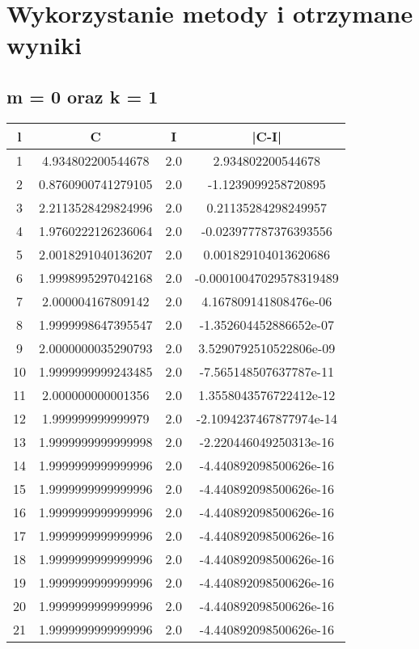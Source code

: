 \documentclass{article}
\begin{document}
\newpage
\section{Wykorzystanie metody i otrzymane wyniki} 
\subsection{m = 0 oraz k = 1}

\begin{table}[h!]
\centering
\begin{tabular}{cccc}
\toprule
l & C & I & |C-I| \\
\midrule
1 & 4.934802200544678 & 2.0 & 2.934802200544678 \\
2 & 0.8760900741279105 & 2.0 & -1.1239099258720895 \\
3 & 2.2113528429824996 & 2.0 & 0.21135284298249957 \\
4 & 1.9760222126236064 & 2.0 & -0.023977787376393556 \\
5 & 2.0018291040136207 & 2.0 & 0.001829104013620686 \\
6 & 1.9998995297042168 & 2.0 & -0.00010047029578319489 \\
7 & 2.000004167809142 & 2.0 & 4.167809141808476e-06 \\
8 & 1.9999998647395547 & 2.0 & -1.352604452886652e-07 \\
9 & 2.0000000035290793 & 2.0 & 3.5290792510522806e-09 \\
10 & 1.9999999999243485 & 2.0 & -7.565148507637787e-11 \\
11 & 2.000000000001356 & 2.0 & 1.3558043576722412e-12 \\
12 & 1.999999999999979 & 2.0 & -2.1094237467877974e-14 \\
13 & 1.9999999999999998 & 2.0 & -2.220446049250313e-16 \\
14 & 1.9999999999999996 & 2.0 & -4.440892098500626e-16 \\
15 & 1.9999999999999996 & 2.0 & -4.440892098500626e-16 \\
16 & 1.9999999999999996 & 2.0 & -4.440892098500626e-16 \\
17 & 1.9999999999999996 & 2.0 & -4.440892098500626e-16 \\
18 & 1.9999999999999996 & 2.0 & -4.440892098500626e-16 \\
19 & 1.9999999999999996 & 2.0 & -4.440892098500626e-16 \\
20 & 1.9999999999999996 & 2.0 & -4.440892098500626e-16 \\
21 & 1.9999999999999996 & 2.0 & -4.440892098500626e-16 \\

\end{tabular}
\end{table}
\end{document}
